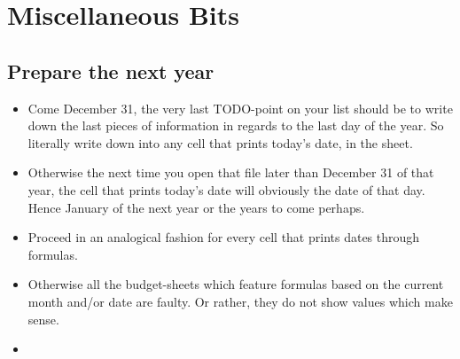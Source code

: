 \section{Miscellaneous Bits}
\label{sec:miscellaneous-bits}

\subsection{Prepare the next year}
\label{subsec:prepare-the-next-year}

\begin{itemize}
	\item Come December 31, the very last TODO-point on your list should be to write down the last pieces of information in regards to the last day of the year.
	So literally write down  into any cell that prints today's date, \eg in the  sheet.
	\item Otherwise the next time you open that file later than December 31 of that year, the cell that prints today's date will obviously the date of that day.
	Hence January of the next year or the years to come perhaps.
	\item Proceed in an analogical fashion for every cell that prints dates through formulas.
	\item Otherwise all the budget-sheets which feature formulas based on the current month and/or date are faulty.
	Or rather, they do not show values which make sense.
	\item 
\end{itemize}



